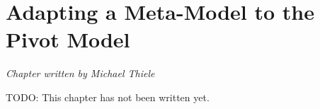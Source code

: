 \chapter{Adapting a Meta-Model to the Pivot Model}
\label{chapter:pivotModelAdaptation}

\begin{flushright}
\textit{Chapter written by Michael Thiele}
\end{flushright}

TODO: This chapter has not been written yet.
